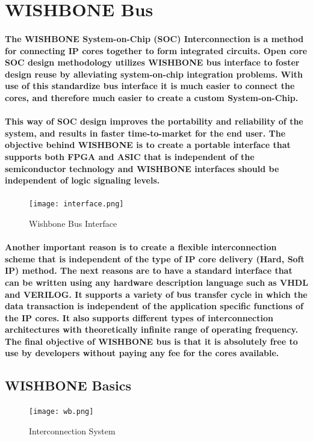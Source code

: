 \documentclass[12pt,a4paper]{report}
\begin{document}
\section{WISHBONE Bus}
\paragraph{\textrm{\textmd{The WISHBONE System-on-Chip (SOC) Interconnection is a method for	connecting IP cores together to form integrated circuits. Open core SOC design methodology utilizes WISHBONE bus interface to foster design reuse by alleviating	system-on-chip integration problems. With use of this standardize bus interface it is much easier to connect the cores, and therefore much easier to create a custom System-on-Chip.}}}
\paragraph{\textrm{\textmd{This way of SOC design improves the portability and reliability of the system, and results in faster time-to-market for the end user. The objective behind WISHBONE is to create a portable interface that supports both FPGA and ASIC that is independent of the 	semiconductor technology and WISHBONE interfaces should be independent of logic signaling levels.}}}
\begin{figure}[h]
	\centering
	\texttt{[image: interface.png]}
	\caption{Wishbone Bus Interface}
	\label{fig:interface}
\end{figure} 		
\paragraph{\textrm{\textmd{Another important reason is to create a flexible interconnection scheme
			that is independent of the type of IP core delivery (Hard, Soft IP) method. The next
			reasons are to have a standard interface that can be written using any hardware
			description language such as VHDL and VERILOG. It supports a variety of bus
			transfer cycle in which the data transaction is independent of the application specific
			functions of the IP cores. It also supports different types of interconnection architectures
			with theoretically infinite range of operating frequency. The final objective of
			WISHBONE bus is that it is absolutely free to use by developers without paying any fee
			for the cores available.}}}
\subsection{WISHBONE Basics }
\begin{figure}[h]
	\centering
	\texttt{[image: wb.png]}
	\caption{Interconnection System}
	\label{fig:wb}
\end{figure}
\end{document}
